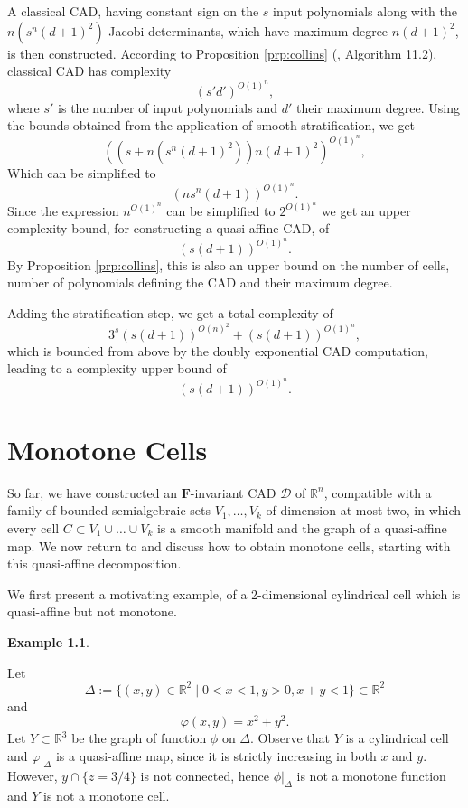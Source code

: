 \documentclass[
]{book}
\theoremstyle{definition}
\theoremstyle{definition}
\newtheorem{example}{Example}[chapter]
\theoremstyle{definition}
\theoremstyle{definition}
\theoremstyle{remark}
\begin{document}
A classical CAD, having constant sign on the \(s\) input polynomials along with the \(n \left(s^n (d+1)^2\right)\) Jacobi determinants, which have maximum degree \(n(d + 1)^{2}\), is then constructed.
According to Proposition \ref{prp:collins} (\citet{bpr2006}, Algorithm 11.2), classical CAD has complexity
\[
\left(s'd'\right)^{O(1)^{n}},
\]
where \(s'\) is the number of input polynomials and \(d'\) their maximum degree.
Using the bounds obtained from the application of smooth stratification, we get
\[
\left(\left(s+n\left(s^{n}(d+1)^{2}\right)\right)n\left(d+1\right)^{2}\right)^{O(1)^{n}},
\]
Which can be simplified to
\[
\left(n s^n \left(d+1\right)\right)^{O(1)^n}.
\]
Since the expression \(n^{O(1)^{n}}\) can be simplified to \(2^{O(1)^{n}}\) we get an upper complexity bound, for constructing a quasi-affine CAD, of
\[
\left(s(d+1)\right)^{O(1)^{n}}.
\]
By Proposition \ref{prp:collins}, this is also an upper bound on the number of cells, number of polynomials defining the CAD and their maximum degree.

Adding the stratification step, we get a total complexity of
\[
3^{s}\left(s(d+1)\right)^{O(n)^{2}}
+ \left(s(d+1)\right)^{O(1)^{n}},
\]
which is bounded from above by the doubly exponential CAD computation, leading to a complexity upper bound of
\[
\left(s(d+1)\right)^{O(1)^{n}}.
\]

\hypertarget{sec:monotone-cells}{%
\chapter{Monotone Cells}\label{sec:monotone-cells}}

So far, we have constructed an \(\mathbf{F}\)-invariant CAD \(\mathcal{D}\) of \(\mathbb{R}^n\), compatible with a family of bounded semialgebraic sets \(V_1,\ldots,V_k\) of dimension at most two, in which every cell \(C\subset V_1\cup \ldots\cup V_k\) is a smooth manifold and the graph of a quasi-affine map.
We now return to \citep[ Theorem 3.20]{bgv15} and discuss how to obtain monotone cells, starting with this quasi-affine decomposition.

We first present a motivating example, of a 2-dimensional cylindrical cell which is quasi-affine but not monotone.

\begin{example}
\protect\hypertarget{exm:monotone-cells}{}\label{exm:monotone-cells}\citep[Example 3.2]{bgv15}

Let
\[
\Delta := \{ (x,y) \in \mathbb{R}^2 \mid 0 < x < 1, y > 0, x + y < 1 \} \subset \mathbb{R}^2
\] and
\[
\varphi(x,y) = x^2 + y^2.
\]
Let \(Y \subset \mathbb{R}^3\) be the graph of function \(\phi\) on \(\Delta\). Observe that \(Y\) is a cylindrical cell and \(\varphi\vert_\Delta\) is a quasi-affine map, since it is strictly increasing in both \(x\) and \(y\).
However, \(y \cap \{ z = 3/4 \}\) is not connected, hence \(\phi\vert_\Delta\) is not a monotone function and \(Y\) is not a monotone cell.
\end{example}
\end{document}
